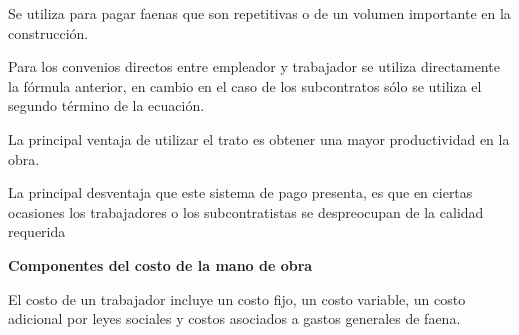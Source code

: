 Se utiliza para pagar faenas que son repetitivas o de un volumen importante en la construcción.

Para los convenios directos entre empleador y trabajador se utiliza directamente la fórmula anterior, en cambio en el caso de los subcontratos sólo se utiliza el segundo término de la ecuación.

La principal ventaja de utilizar el trato es obtener una mayor productividad en la obra.

La principal desventaja que este sistema de pago presenta, es que en ciertas ocasiones los trabajadores o los subcontratistas se despreocupan de la calidad requerida

\textbf{Componentes del costo de la mano de obra}

El costo de un trabajador incluye un costo fijo, un costo variable, un costo adicional por leyes sociales y costos asociados a gastos generales de faena.

